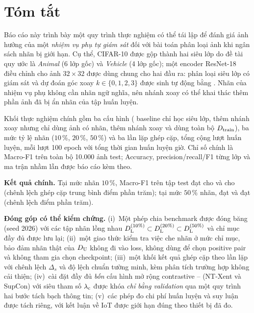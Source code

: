\section*{Tóm tắt}

\RIncomplete

\noindent
Báo cáo này trình bày một quy trình thực nghiệm có thể tái lập để đánh giá ảnh hưởng của
một \emph{nhiệm vụ phụ tự giám sát} đối với bài toán phân loại ảnh khi ngân sách nhãn bị
giới hạn. Cụ thể, CIFAR-10 được gộp thành hai siêu lớp do đề tài quy ước là
\emph{Animal} (6 lớp gốc) và \emph{Vehicle} (4 lớp gốc); một encoder ResNet-18 điều chỉnh cho
ảnh $32 \times 32$ được dùng chung cho hai đầu ra: phân loại siêu lớp có giám sát và dự đoán
góc xoay $k \in \{0,1,2,3\}$ được sinh tự động bằng . Nhãn của nhiệm vụ
phụ không cần nhãn ngữ nghĩa, nên nhánh xoay có thể khai thác thêm phần ảnh đã bị ẩn nhãn
của tập huấn luyện.

Khối thực nghiệm chính gồm ba cấu hình ( baseline chỉ học siêu lớp,  thêm
nhánh xoay nhưng chỉ dùng ảnh có nhãn,  thêm nhánh xoay và dùng toàn bộ $D_{\mathrm{train}}$),
ba mức tỷ lệ nhãn ($10\,\%$, $20\,\%$, $50\,\%$) và ba lần lặp ghép cặp, tổng cộng \RRuns{}
lượt huấn luyện, mỗi lượt 100 epoch với tổng thời gian huấn luyện \RTotalHours{} giờ.
Chỉ số chính là Macro-F1 trên toàn bộ 10.000 ảnh test; Accuracy, precision/recall/F1 từng lớp
và ma trận nhầm lẫn được báo cáo kèm theo.

\medskip
\noindent\textbf{Kết quả chính.}
Tại mức nhãn $10\,\%$, Macro-F1 trên tập test đạt \REoneTenVal{} cho  và \REtwoTenVal{}
cho  (chênh lệch ghép cặp trung bình \REtwoTenDelta{} điểm phần trăm); tại mức
$50\,\%$ nhãn,  đạt \REoneFiftyVal{} và  đạt \REtwoFiftyVal{}
(chênh lệch \REtwoFiftyDelta{} điểm phần trăm). \RFindingSentence

\medskip
\noindent\textbf{Đóng góp có thể kiểm chứng.}
(i)~Một phép chia benchmark được đóng băng (seed 2026) với các tập nhãn lồng nhau
$D_{\mathrm{L}}^{(10\%)} \subset D_{\mathrm{L}}^{(20\%)} \subset D_{\mathrm{L}}^{(50\%)}$ và chỉ mục đầy đủ được lưu lại;
(ii)~một giao thức kiểm tra việc che nhãn ở mức chỉ mục, bảo đảm nhãn thật của $D_{\mathrm{U}}$ không
đi vào loss, không dùng để chọn positive pair và không tham gia chọn checkpoint;
(iii)~một khối kết quả ghép cặp theo lần lặp với chênh lệch $\Delta_s$ và độ lệch chuẩn
tường minh, kèm phân tích trường hợp không cải thiện;
(iv)~cài đặt đầy đủ \emph{bốn} cấu hình mở rộng contrastive -- (NT-Xent và
SupCon) với siêu tham số $\lambda_{\mathrm{c}}$ được khóa \emph{chỉ bằng validation} qua một quy trình
hai bước tách bạch thông tin;
(v)~các phép đo chi phí huấn luyện và suy luận được tách riêng, với kết luận về IoT được
giới hạn đúng theo thiết bị đã đo.

